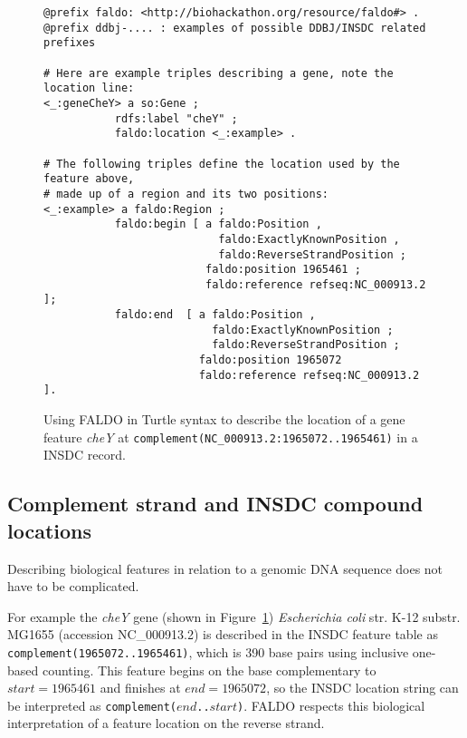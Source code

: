 %
\begin{figure}
\begin{shaded}
\small
\begin{verbatim} 
@prefix faldo: <http://biohackathon.org/resource/faldo#> .
@prefix ddbj-.... : examples of possible DDBJ/INSDC related prefixes

# Here are example triples describing a gene, note the location line:
<_:geneCheY> a so:Gene ;
           rdfs:label "cheY" ;
           faldo:location <_:example> .

# The following triples define the location used by the feature above,
# made up of a region and its two positions:
<_:example> a faldo:Region ;
           faldo:begin [ a faldo:Position ,
                           faldo:ExactlyKnownPosition ,
                           faldo:ReverseStrandPosition ;
                         faldo:position 1965461 ;
                         faldo:reference refseq:NC_000913.2 ];
           faldo:end  [ a faldo:Position ,
                          faldo:ExactlyKnownPosition ;
                          faldo:ReverseStrandPosition ;
                        faldo:position 1965072
                        faldo:reference refseq:NC_000913.2 ].
\end{verbatim}
\end{shaded}
\caption{Using FALDO in Turtle\cite{TurtleFormatSpec} syntax to describe the location of a
gene feature \textit{cheY} at \texttt{complement(NC\_000913.2:1965072..1965461)} in a INSDC record.}
\label{fig:insdcComplement}
\end{figure}


\subsection*{Complement strand and INSDC compound locations}

Describing biological features in relation to a genomic DNA sequence does not have to be complicated.

For example the \textit{cheY} gene (shown in Figure~\ref{fig:insdcComplement})
\textit{Escherichia coli} str. K-12 substr. MG1655 (accession NC\_000913.2)
is described in the INSDC feature table as \texttt{complement(1965072..1965461)},
which is 390 base pairs using inclusive one-based counting.
This feature begins on the base complementary to $start = 1965461$
and finishes at $end = 1965072$, so the INSDC location string
can be interpreted as \texttt{complement($end$..$start$)}.
FALDO respects this biological interpretation of a feature location
on the reverse strand.

